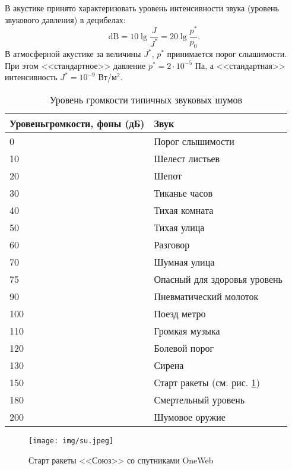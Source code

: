 В акустике принято характеризовать уровень интенсивности звука (уровень звукового давления) в децибелах:
\begin{equation}
    \mathrm{dB} = 10 \lg \frac{J}{{J}^*} =
    20 \lg \frac{{p}^*}{p_0}.
\end{equation}
В атмосферной акустике  за величины  $J^*$, $p^*$ принимается порог слышимости. При этом <<стандартное>> давление $p^*=2\cdot10^{-5}$  Па, а  <<стандартная>> интенсивность $J^*=10^{-9}$ Вт/м${}^2$.

\begin{table}[H]
\centering
\caption{Уровень громкости типичных звуковых шумов}
\begin{tabular}{p{5cm} p{7cm}}
\toprule
{Уровень\hspace{0.2em}громкости}, фоны (дБ) & Звук \\ \midrule
 0 &	Порог слышимости 	\\
 10 &	Шелест листьев 	\\
 20 &	Шепот 	\\
 30 &	Тиканье часов 	\\
 40 &	Тихая комната 	\\
 50 &	Тихая улица 	\\
 60 &	Разговор 	\\
 70 &	Шумная улица 	\\
 75 &	Опасный для здоровья уровень 	\\
 90 &	Пневматический молоток 	\\
 100 &	Поезд метро 	\\
 110 &	Громкая музыка 	\\
 120 &	Болевой порог 	\\
 130 &	Сирена 	\\
 150 &	Старт ракеты (см. рис. \ref{fig:startraket}) 	\\
 180 &	Смертельный уровень 	\\
 200 &	Шумовое оружие 	\\\bottomrule
\end{tabular}
\end{table}

\begin{figure}[H]
	\centering
	\texttt{[image: img/su.jpeg]}
	\caption{Старт ракеты <<Союз>> со спутниками OneWeb}
	\label{fig:startraket}
\end{figure}

